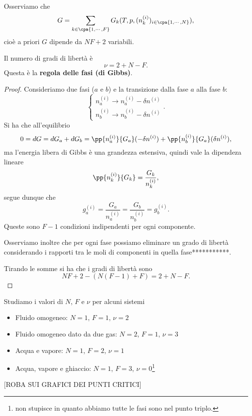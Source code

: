 \noindent
Osserviamo che
\[G=\sum_{k\in\cpa{1,\cdots, F}}G_k(T,p,(n_k^{(i)})_{i\in\cpa{1,\cdots, N}}),\]
cio\`e a priori $G$ dipende da $NF+2$ variabili.

\begin{proposition}\label{RegolaFasiGibbs}
Il numero di gradi di libert\`a \`e
\[\nu=2+N-F.\]
Questa \`e la \textbf{regola delle fasi (di Gibbs)}.
\end{proposition}
\begin{proof}
Consideriamo due fasi ($a$ e $b$) e la transizione dalla fase $a$ alla fase $b$:
\[\begin{cases}
n_a^{(i)}\to n_a^{(i)}-\delta n^{(i)}\\
n_b^{(i)}\to n_b^{(i)}-\delta n^{(i)}
\end{cases}.\]
Si ha che all'equilibrio
\[0=dG=dG_a+dG_b=\pp {n_a^{(i)}}{G_a}(-\delta n^{(i)})+\pp {n_b^{(i)}}{G_a}(\delta n^{(i)}),\]
ma l'energia libera di Gibbs \`e una grandezza estensiva, quindi vale la dipendeza lineare
\[\pp {n_k^{(i)}}{G_k}=\frac{G_k}{n_k^{(i)}},\]
segue dunque che
\[g_a^{(i)}=\frac{G_a}{n_a^{(i)}}=\frac{G_b}{n_b^{(i)}}=g_b^{(i)}.\]
Queste sono $F-1$ condizioni indipendenti per ogni componente.
\bigskip

\noindent Osserviamo inoltre che per ogni fase possiamo eliminare un grado di libert\`a considerando i rapporti tra le moli di componenti in quella fase***********.\bigskip

\noindent Tirando le somme si ha che i gradi di libert\`a sono
\[NF+2-(N(F-1)+F)=2+N-F.\]
\end{proof}



\begin{example}
Studiamo i valori di $N$, $F$ e $\nu$ per alcuni sistemi
\begin{itemize}
\item Fluido omogeneo: $N=1$, $F=1$, $\nu=2$
\item Fluido omogeneo dato da due gas: $N=2$, $F=1$, $\nu=3$
\item Acqua e vapore: $N=1$, $F=2$, $\nu=1$
\item Acqua, vapore e ghiaccio: $N=1$, $F=3$, $\nu=0$\footnote{non stupisce in quanto abbiamo tutte le fasi sono nel punto triplo.}
\end{itemize}
\end{example}


[ROBA SUI GRAFICI DEI PUNTI CRITICI]

